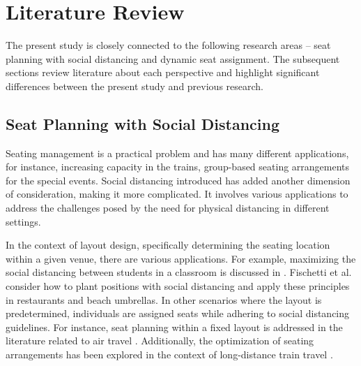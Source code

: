 \section{Literature Review}\label{literature}
The present study is closely connected to the following research areas -- seat planning with social distancing and dynamic seat assignment. The subsequent sections review literature about each perspective and highlight significant differences between the present study and previous research.







\subsection{Seat Planning with Social Distancing}
Seating management is a practical problem and has many different applications, for instance, increasing capacity in the trains, group-based seating arrangements for the special events. Social distancing introduced has added another dimension of consideration, making it more complicated. It involves various applications to address the challenges posed by the need for physical distancing in different settings.


In the context of layout design, specifically determining the seating location within a given venue, there are various applications. For example, maximizing the social distancing between students in a classroom is discussed in \cite{bortolete2022support}. Fischetti et al.\cite{fischetti2023safe} consider how to plant positions with social distancing and apply these principles in restaurants and beach umbrellas. In other scenarios where the layout is predetermined, individuals are assigned seats while adhering to social distancing guidelines. For instance, seat planning within a fixed layout is addressed in the literature related to air travel \cite{ghorbani2020model, salari2022social}. Additionally, the optimization of seating arrangements has been explored in the context of long-distance train travel \cite{haque2022optimization}.

